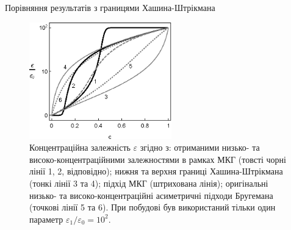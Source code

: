 \documentclass[10pt]{beamer}
\begin{document}
\begin{frame}{Порівняння результатів з границями Хашина-Штрікмана}

\begin{figure}[tb]
    \centering
    \includegraphics[width=0.55\textwidth]{images/hanai-fig2.eps}
    \caption{\label{fig:HSbounds}
    Концентраційна залежність $\varepsilon$ згідно з: отриманими низько- та високо-концентраційними залежностями в рамках МКГ (товсті чорні лінії 1, 2, відповідно); нижня та верхня границі Хашина-Штрікмана (тонкі лінії 3 та 4); підхід МКГ (штрихована лінія); оригінальні низько- та високо-концентраційні асиметричні підходи Бругемана (точкові лінії 5 та 6). При побудові був використаний тільки один параметр $\varepsilon_1/\varepsilon_0 = 10^2$.}
\end{figure}

\end{frame}


\end{document}
